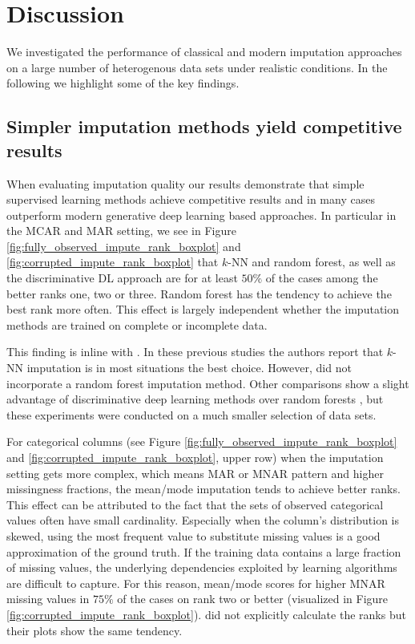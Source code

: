 \section{Discussion}
\label{sec:discussion}

We investigated the performance of classical and modern imputation approaches on a large number of heterogenous data sets under realistic conditions. In the following we highlight some of the key findings. 

\subsection{Simpler imputation methods yield competitive results}
%
When evaluating imputation quality our results demonstrate that simple supervised learning methods achieve competitive results and in many cases outperform modern generative deep learning based approaches. In particular in the MCAR and MAR setting, we see in Figure \ref{fig:fully_observed_impute_rank_boxplot} and \ref{fig:corrupted_impute_rank_boxplot} that $k$-NN and random forest, as well as the discriminative DL approach are for at least $50\%$ of the cases among the better ranks one, two or three. Random forest has the tendency to achieve the best rank more often. This effect is largely independent whether the imputation methods are trained on complete or incomplete data.

This finding is inline with \cite{Imputation_Benchmark_3, Imputation_Benchmark_2, Imputation_Benchmark_4}. In these previous studies the authors report that $k$-NN imputation is in most situations the best choice. However, \cite{Imputation_Benchmark_2, Imputation_Benchmark_4} did not incorporate a random forest imputation method. Other comparisons show a slight advantage of discriminative deep learning methods over random forests \citep{biessmann2019datawig}, but these experiments were conducted on a much smaller selection of data sets. 

For categorical columns (see Figure \ref{fig:fully_observed_impute_rank_boxplot} and \ref{fig:corrupted_impute_rank_boxplot}, upper row) when the imputation setting gets more complex, which means MAR or MNAR pattern and higher missingness fractions, the mean/mode imputation tends to achieve better ranks. This effect can be attributed to the fact that the sets of observed categorical values often have small cardinality. Especially when the column's distribution is skewed, using the most frequent value to substitute missing values is a good approximation of the ground truth. If the training data contains a large fraction of missing values, the underlying dependencies exploited by learning algorithms are difficult to capture. For this reason, mean/mode scores for higher MNAR missing values in $75\%$ of the cases on rank two or better (visualized in Figure \ref{fig:corrupted_impute_rank_boxplot}). \cite{Imputation_Benchmark_3} did not explicitly calculate the ranks but their plots show the same tendency. 


